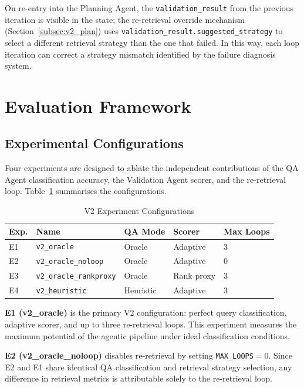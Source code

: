 On re-entry into the Planning Agent, the \texttt{validation\_result}
from the previous iteration is visible in the state; the re-retrieval
override mechanism (Section~\ref{subsec:v2_plan}) uses
\texttt{validation\_result.suggested\_strategy} to select a different
retrieval strategy than the one that failed. In this way, each loop
iteration can correct a strategy mismatch identified by the failure
diagnosis system.


\section{Evaluation Framework}
\label{sec:v2_eval_framework}

\subsection{Experimental Configurations}
\label{subsec:v2_experiments}

Four experiments are designed to ablate the independent contributions of
the QA Agent classification accuracy, the Validation Agent scorer, and
the re-retrieval loop. Table~\ref{tab:v2_experiments} summarises the
configurations.

\begin{table}[H]
\centering
\caption{V2 Experiment Configurations}
\label{tab:v2_experiments}
\begin{tabular}{lllll}
\toprule
\textbf{Exp.} & \textbf{Name} & \textbf{QA Mode} & \textbf{Scorer} & \textbf{Max Loops} \\
\midrule
E1 & \texttt{v2\_oracle}           & Oracle           & Adaptive    & 3 \\
E2 & \texttt{v2\_oracle\_noloop}   & Oracle           & Adaptive    & 0 \\
E3 & \texttt{v2\_oracle\_rankproxy}& Oracle           & Rank proxy  & 3 \\
E4 & \texttt{v2\_heuristic}        & Heuristic        & Adaptive    & 3 \\
\bottomrule
\end{tabular}
\end{table}

\textbf{E1 (v2\_oracle)} is the primary V2 configuration: perfect query
classification, adaptive scorer, and up to three re-retrieval loops. This
experiment measures the maximum potential of the agentic pipeline under ideal
classification conditions.

\textbf{E2 (v2\_oracle\_noloop)} disables re-retrieval by setting
\texttt{MAX\_LOOPS}$=0$. Since E2 and E1 share identical QA classification and
retrieval strategy selection, any difference in retrieval metrics is attributable
solely to the re-retrieval loop.

